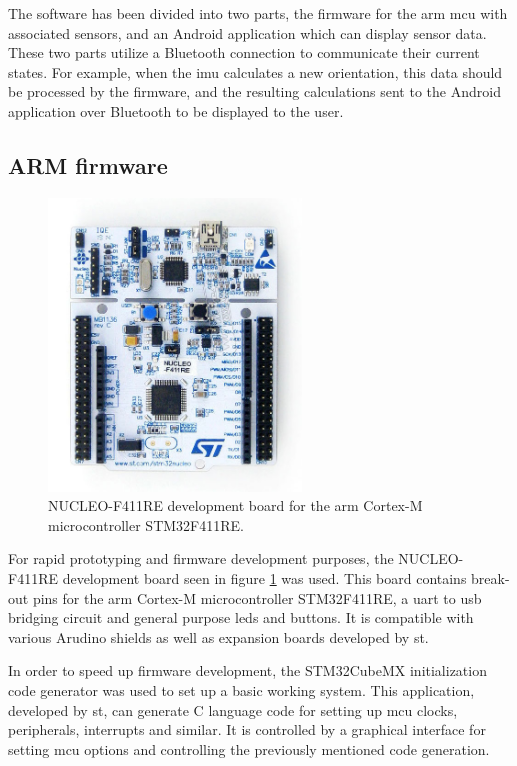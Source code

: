 The software has been divided into two parts, the firmware for the \gls{arm} \gls{mcu} with associated sensors, and an Android application which can display sensor data. These two parts utilize a Bluetooth connection to communicate their current states. For example, when the \gls{imu} calculates a new orientation, this data should be processed by the firmware, and the resulting calculations sent to the Android application over Bluetooth to be displayed to the user.

\subsection{ARM firmware}

\begin{figure}[H]
\centering
\includegraphics[width=0.6\textwidth]{Figures/stm32nucleo.jpg}
\caption{NUCLEO-F411RE development board for the \gls{arm} Cortex-M microcontroller STM32F411RE.}
\label{nucleo-board}
\end{figure}

For rapid prototyping and firmware development purposes, the NUCLEO-F411RE development board seen in figure \ref{nucleo-board} was used. This board contains break-out pins for the \gls{arm} Cortex-M microcontroller STM32F411RE, a \gls{uart} to \gls{usb} bridging circuit and general purpose \gls{led}s and buttons. It is compatible with various Arudino shields as well as expansion boards developed by \gls{st}.

In order to speed up firmware development, the STM32CubeMX \cite{stm32cubemx} initialization code generator was used to set up a basic working system. This application, developed by \gls{st}, can generate C language code for setting up \gls{mcu} clocks, peripherals, interrupts and similar. It is controlled by a graphical interface for setting \gls{mcu} options and controlling the previously mentioned code generation.

